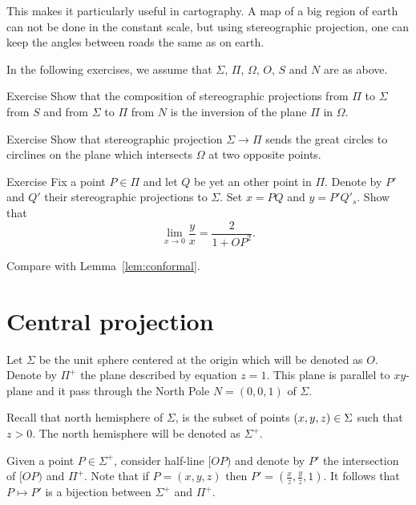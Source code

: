 This makes it particularly useful in cartography.
A map of a big region of earth can not be done in the constant scale,
but using stereographic projection, one can keep the angles between roads the same as on earth.

In the following exercises,
we assume that $\Sigma$, $\Pi$, $\Omega$, $O$, $S$ and $N$ are as above.
  
\begin{thm}{Exercise}\label{ex:two-stereographics}
Show that the composition of stereographic projections 
from $\Pi$ to $\Sigma$ from  $S$ and
from $\Sigma$ to $\Pi$ from  $N$ is 
the inversion of the plane $\Pi$ in $\Omega$.
\end{thm}

\begin{thm}{Exercise}\label{ex:great-circ}
Show that stereographic projection $\Sigma\to\Pi$
sends the great circles to circlines on the plane which intersects $\Omega$ at two opposite points.
\end{thm}

\begin{thm}{Exercise}\label{ex:conform-sphere}
Fix a point $P\in \Pi$  and let $Q$ be yet an other point in $\Pi$.
Denote by $P'$ and $Q'$ their stereographic projections to $\Sigma$.
Set $x=PQ$ and $y=P'Q'_s$.
Show that
$$\lim_{x\to 0} \frac{y}{x}=\frac{2}{1+OP^2}.$$

Compare with Lemma~\ref{lem:conformal}.
\end{thm}



\section*{Central projection}

Let $\Sigma$ be the unit sphere centered at the origin which will be denoted as $O$.
Denote by $\Pi^+$ the plane described by equation $z=1$.
This plane is parallel to $xy$-plane and it  pass through 
the North Pole $N=(0,0,1)$ of $\Sigma$.

Recall that north hemisphere of $\Sigma$,
is the subset of points $(x,y,z)\z\in \Sigma$ such that $z>0$.
The north hemisphere will be denoted as $\Sigma^+$.

Given a point $P\in \Sigma^+$, consider half-line $[OP)$ and denote by $P'$ the intersection of $[OP)$ and $\Pi^+$.
Note that if $P=(x,y,z)$ then $P'=(\tfrac xz,\tfrac yz,1)$.
It follows that $P\mapsto P'$ is a bijection between $\Sigma^+$ and $\Pi^+$.


